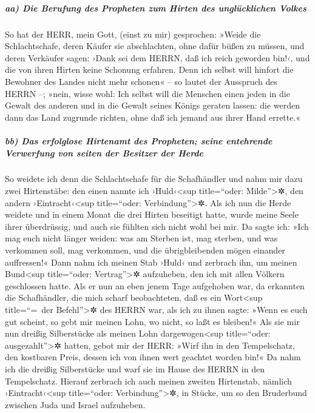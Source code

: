 \hypertarget{aa-die-berufung-des-propheten-zum-hirten-des-ungluxfccklichen-volkes}{%
\subparagraph{aa) Die Berufung des Propheten zum Hirten des
unglücklichen
Volkes}\label{aa-die-berufung-des-propheten-zum-hirten-des-ungluxfccklichen-volkes}}

 So hat der HERR, mein Gott, (einst zu mir) gesprochen:
»Weide die Schlachtschafe,  deren Käufer sie abschlachten,
ohne dafür büßen zu müssen, und deren Verkäufer sagen: ›Dank sei dem
HERRN, daß ich reich geworden bin!‹, und die von ihren Hirten keine
Schonung erfahren.  Denn ich selbst will hinfort die
Bewohner des Landes nicht mehr schonen« -- so lautet der Ausspruch des
HERRN --; »nein, wisse wohl: Ich selbst will die Menschen einen jeden in
die Gewalt des anderen und in die Gewalt seines Königs geraten lassen:
die werden dann das Land zugrunde richten, ohne daß ich jemand aus ihrer
Hand errette.«

\hypertarget{bb-das-erfolglose-hirtenamt-des-propheten-seine-entehrende-verwerfung-von-seiten-der-besitzer-der-herde}{%
\subparagraph{bb) Das erfolglose Hirtenamt des Propheten; seine
entehrende Verwerfung von seiten der Besitzer der
Herde}\label{bb-das-erfolglose-hirtenamt-des-propheten-seine-entehrende-verwerfung-von-seiten-der-besitzer-der-herde}}

 So weidete ich denn die Schlachtschafe für die
Schafhändler und nahm mir dazu zwei Hirtenstäbe: den einen nannte ich
›Huld‹\textless sup title=``oder: Milde''\textgreater✲, den andern
›Eintracht‹\textless sup title=``oder: Verbindung''\textgreater✲. Als
ich nun die Herde weidete  und in einem Monat die drei
Hirten beseitigt hatte, wurde meine Seele ihrer überdrüssig, und auch
sie fühlten sich nicht wohl bei mir.  Da sagte ich: »Ich
mag euch nicht länger weiden: was am Sterben ist, mag sterben, und was
verkommen soll, mag verkommen, und die übrigbleibenden mögen einander
auffressen!«  Dann nahm ich meinen Stab ›Huld‹ und
zerbrach ihn, um meinen Bund\textless sup title=``oder:
Vertrag''\textgreater✲ aufzuheben, den ich mit allen Völkern geschlossen
hatte.  Als er nun an eben jenem Tage aufgehoben war, da
erkannten die Schafhändler, die mich scharf beobachteten, daß es ein
Wort\textless sup title=``=~der Befehl''\textgreater✲ des HERRN war,
 als ich zu ihnen sagte: »Wenn es euch gut scheint, so
gebt mir meinen Lohn, wo nicht, so laßt es bleiben!« Als sie mir nun
dreißig Silberstücke als meinen Lohn dargewogen\textless sup
title=``oder: ausgezahlt''\textgreater✲ hatten,  gebot
mir der HERR: »Wirf ihn in den Tempelschatz, den kostbaren Preis, dessen
ich von ihnen wert geachtet worden bin!« Da nahm ich die dreißig
Silberstücke und warf sie im Hause des HERRN in den Tempelschatz.
 Hierauf zerbrach ich auch meinen zweiten Hirtenstab,
nämlich ›Eintracht‹\textless sup title=``oder:
Verbindung''\textgreater✲, in Stücke, um so den Bruderbund zwischen Juda
und Israel aufzuheben.

